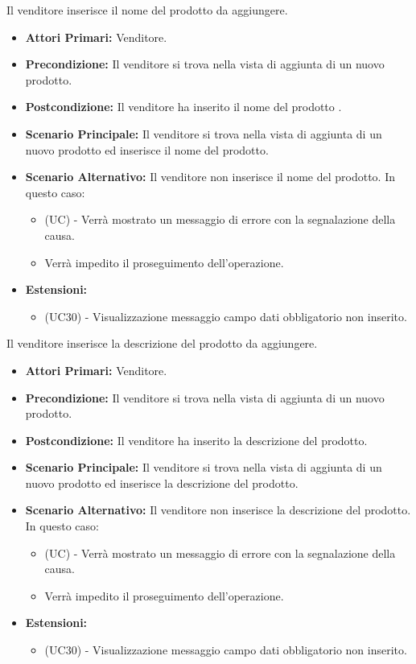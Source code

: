 \resetSubUC

Il venditore inserisce il nome del prodotto da aggiungere.
\begin{itemize}
    \item \textbf{Attori Primari:} Venditore.
    \item \textbf{Precondizione:} Il venditore si trova nella vista di aggiunta di un nuovo prodotto.
    \item \textbf{Postcondizione:} Il venditore ha inserito il nome del prodotto .
    \item \textbf{Scenario Principale:} Il venditore si trova nella vista di aggiunta di un nuovo prodotto ed inserisce il nome del prodotto.
    \item \textbf{Scenario Alternativo:} Il venditore non inserisce il nome del prodotto. In questo caso:
    \begin{itemize}
        \item (UC) - Verrà mostrato un messaggio di errore con la segnalazione della causa.
        \item Verrà impedito il proseguimento dell'operazione.
    \end{itemize}
    \item \textbf{Estensioni:}
    \begin{itemize}
        \item (UC30) - Visualizzazione messaggio campo dati obbligatorio non inserito.
    \end{itemize}
\end{itemize}

Il venditore inserisce la descrizione del prodotto da aggiungere.
\begin{itemize}
    \item \textbf{Attori Primari:} Venditore.
    \item \textbf{Precondizione:} Il venditore si trova nella vista di aggiunta di un nuovo prodotto.
    \item \textbf{Postcondizione:} Il venditore ha inserito la descrizione del prodotto.
    \item \textbf{Scenario Principale:} Il venditore si trova nella vista di aggiunta di un nuovo prodotto ed inserisce la descrizione del prodotto.
    \item \textbf{Scenario Alternativo:} Il venditore non inserisce la descrizione del prodotto. In questo caso:
    \begin{itemize}
        \item (UC) - Verrà mostrato un messaggio di errore con la segnalazione della causa.
        \item Verrà impedito il proseguimento dell'operazione.
    \end{itemize}
    \item \textbf{Estensioni:}
    \begin{itemize}
        \item (UC30) - Visualizzazione messaggio campo dati obbligatorio non inserito.
    \end{itemize}
\end{itemize}

